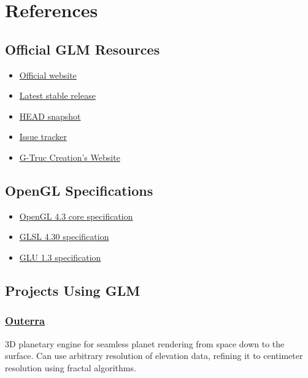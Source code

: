 \documentclass{scrartcl}
\numberwithin{figure}{subsection}
\begin{document}
\newpage{}

\section{References}

\subsection{Official GLM Resources}

\begin{itemize}
  \item \href{http://glm.g-truc.net}{Official website}
  \item \href{https://github.com/g-truc/glm/releases/tag/0.9.7.1}{Latest stable release}
  \item \href{https://github.com/g-truc/glm/archive/master.zip}{HEAD snapshot}
  \item \href{https://github.com/g-truc/glm/issues}{Issue tracker}
  \item \href{http://www.g-truc.net}{G-Truc Creation's Website}
\end{itemize}

\subsection{OpenGL Specifications}

\begin{itemize}
  \item \href{http://www.opengl.org/registry/doc/glspec43.core.20120806.withchanges.pdf}{OpenGL 4.3 core specification}
  \item \href{http://www.opengl.org/registry/doc/GLSLangSpec.4.30.7.diff.pdf}{GLSL 4.30 specification}
  \item \href{http://www.opengl.org/documentation/specs/glu/glu1_3.pdf}{GLU 1.3 specification}
\end{itemize}

\subsection{Projects Using GLM}

\subsubsection{\href{http://outerra.com/}{Outerra}}

3D planetary engine for seamless planet rendering from space down to the surface. Can use arbitrary resolution of elevation data, refining it to centimeter resolution using fractal algorithms.
\end{document}

